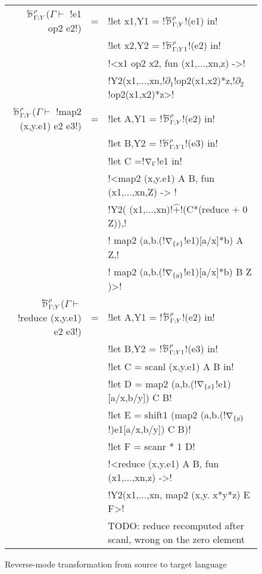 \begin{figure*}[t]
\begin{tabular}{r c l}
        $\directD{\rho}{\Gamma}{Y}$($\Gamma\vdash $ !e1 op2 e2!) &=& 
            !let x1,Y1 = !$\directD{\rho}{\Gamma}{Y}$!(e1) in! \\
            && !let x2,Y2 = !$\directD{\rho}{\Gamma}{Y1}$!(e2) in! \\
            && !<x1 op2 x2, fun (x1,...,xn,z) ->! \\
            && !Y2(x1,...,xn,!$\partial_1$!op2(x1,x2)*z,!$\partial_2$!op2(x1,x2)*z>! \\
        $\directD{\rho}{\Gamma}{Y}$($\Gamma\vdash $ !map2 (x,y.e1) e2 e3!) &=&  
            !let A,Y1 = !$\directD{\rho}{\Gamma}{Y}$!(e2) in! \\
            && !let B,Y2 = !$\directD{\rho}{\Gamma}{Y1}$!(e3) in! \\
            && !let C =!$\nabla_{\Gamma}$!e1 in!\\
            && !<map2 (x,y.e1) A B, fun (x1,...,xn,Z) -> !\\
            && !Y2( (x1,...,xn)!$\widehat{+}$!(C*(reduce + 0 Z)),!\\
            && \quad\quad! map2 (a,b.(!$\nabla_{\{x\}}$!e1)[a/x]*b) A Z,!\\
            && \quad\quad! map2 (a,b.(!$\nabla_{\{y\}}$!e1)[a/x]*b) B Z )>!\\
        $\directD{\rho}{\Gamma}{Y}$($\Gamma\vdash $ !reduce (x,y.e1) e2 e3!) &=&
            !let A,Y1 = !$\directD{\rho}{\Gamma}{Y}$!(e2) in! \\
            && !let B,Y2 = !$\directD{\rho}{\Gamma}{Y1}$!(e3) in! \\
            && !let C = scanl (x,y.e1) A B in! \\
            && !let D = map2 (a,b.(!$\nabla_{\{x\}}$!e1)[a/x,b/y]) C B! \\
            && !let E = shift1 (map2 (a,b.(!$\nabla_{\{y\}}$!)e1[a/x,b/y]) C B)! \\
            && !let F = scanr * 1 D! \\
            && !<reduce (x,y.e1) A B, fun (x1,...,xn,z) ->! \\
            && !Y2(x1,...,xn, map2 (x,y. x*y*z) E F>! \\
            && TODO: reduce recomputed after scanl, wrong on the zero element \\
        \end{tabular}
    \caption{Reverse-mode transformation from source to target language}
    \label{fig:direct_diff_macro}    
\end{figure*}